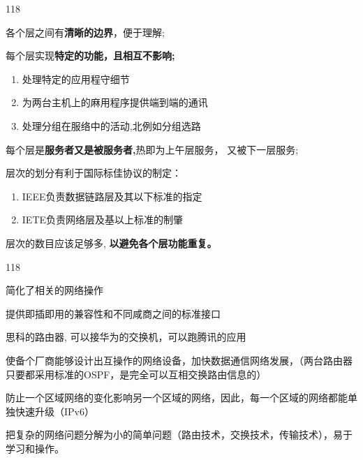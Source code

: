 \documentclass[cn,chinese,color=cyan]{elegantbook}
\begin{document}
\begin{warning}[title={{\color{green} \faEnvira} OSI参考模型遵循的几大原则：\ }]
\begin{dinglist}{118}
	\item 各个层之间有\textbf{清晰的边界}，便于理解;
	\item 每个层实现\textbf{特定的功能，且相互不影响;}
\begin{enumerate}
	\item 处理特定的应用程守细节
	\item 为两台主机上的麻用程序提供端到端的通讯
	\item 处理分组在服络中的活动,北例如分组选路
\end{enumerate}
	\item 每个层是\textbf{服务者又是被服务者,}热即为上午层服务， 又被下一层服务;
	\item 层次的划分有利于国际标佳协议的制定：
\begin{enumerate}
	\item IEEE负责数据链路层及其以下标准的指定
	\item IETE负责网络层及基以上标准的制肇
\end{enumerate}	
	
\item 层次的数目应该足够多, \textbf{以避免各个层功能重复。}
\end{dinglist}
\end{warning}


\begin{warning}[title={{\color{green} \faEnvira} OSI参考模型遵循的几大优点：\ }]
	\begin{dinglist}{118}
		\item 简化了相关的网络操作
		\item 提供即插即用的兼容性和不同咸商之间的标准接口
		
		思科的路由器, 可以接华为的交换机，可以跑腾讯的应用
		
		\item 使备个厂商能够设计出互操作的网络设备，加快数据通信网络发展，（两台路由器只要都采用标准的OSPF，是完全可以互相交换路由信息的）
		
		\item 防止一个区域网络的变化影响另一个区域的网络，因此，每一个区域的网络都能单独快速升级（IPv6）
		
		\item 把复杂的网络问题分解为小的简单问题（路由技术，交换技术，传输技术），易于学习和操作。
	\end{dinglist}
\end{warning}
\end{document}
